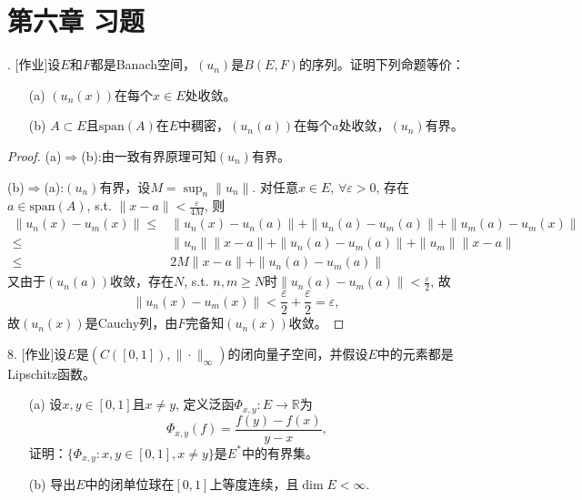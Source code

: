 \documentclass[a4paper,8pt]{ctexart}\textwidth 140mm \textheight 216mm
\newcommand{\e}{\varepsilon}
\newcommand{\8}{\infty}
\begin{document}
\section{第六章 习题}


. [作业]设$E$和$F$都是Banach空间，$(u_n)$是$B(E,F)$的序列。证明下列命题等价：
\begin{itemize}
	\item[(a)] $(u_n(x))$在每个$x\in E$处收敛。
	\item[(b)] $A\subset E$且$\mathrm{span}(A)$在$E$中稠密，$(u_n(a))$在每个$a$处收敛，$(u_n)$有界。
\end{itemize}
\begin{proof}
	(a)$\Rightarrow$(b):由一致有界原理可知$(u_n)$有界。
	
	(b)$\Rightarrow$(a):$(u_n)$有界，设$M=\sup_n\|u_n\|$. 对任意$x\in E$, $\forall\e>0$, 存在$a\in \mathrm{span}(A)$, s.t. $\|x-a\|<\frac{\e}{4M}$, 则
	\begin{equation*}
	\begin{split}
	\|u_n(x)-u_m(x)\|\leq& \|u_n(x)-u_n(a)\|+\|u_n(a)-u_m(a)\|+\|u_m(a)-u_m(x)\|\\
	\leq& \|u_n\|\|x-a\|+\|u_n(a)-u_m(a)\|+\|u_m\|\|x-a\|\\
	\leq& 2M\|x-a\|+\|u_n(a)-u_m(a)\|
	\end{split}
	\end{equation*}
	又由于$(u_n(a))$收敛，存在$N$, s.t. $n,m\geq N$时$\|u_n(a)-u_m(a)\|<\frac{\e}{2}$, 故
	$$\|u_n(x)-u_m(x)\|<\frac{\e}{2}+\frac{\e}{2}=\e,$$
	故$(u_n(x))$是Cauchy列，由$F$完备知$(u_n(x))$收敛。
\end{proof}

8.  [作业]设$E$是$(C([0,1]),\|\cdot\|_\infty)$的闭向量子空间，并假设$E$中的元素都是Lipschitz函数。
\begin{itemize}
	\item[(a)] 设$x,y\in[0,1]$且$x\ne y$, 定义泛函$\Phi_{x,y}:E\to\mathbb{R}$为
	\begin{equation*}
	\Phi_{x,y}(f)=\frac{f(y)-f(x)}{y-x},
	\end{equation*}
	证明：$\{\Phi_{x,y}:x,y\in[0,1],x\ne y\}$是$E^*$中的有界集。
	\item[(b)] 导出$E$中的闭单位球在$[0,1]$上等度连续，且$\dim E<\infty$.
\end{itemize}
\end{document}
